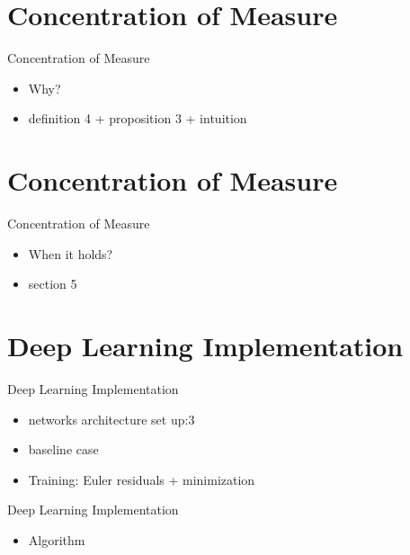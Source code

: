 \documentclass[dvipsnames,mathserif]{beamer}
\begin{document}
{\section{Concentration of Measure}
\begin{frame}{Concentration of Measure}
    \begin{itemize}
        \item Why? 
        \vspace{0.2cm}
        \item definition 4 + proposition 3 + intuition\\
        \vspace{0.2cm}
    \end{itemize}
\end{frame}

\section{Concentration of Measure}
\begin{frame}{Concentration of Measure}
    \begin{itemize}
        \item When it holds?\\
        \vspace{0.2cm}
        \item section 5
    \end{itemize}
\end{frame}


\section{Deep Learning Implementation}
\begin{frame}{Deep Learning Implementation}
    \begin{itemize}
        \item networks architecture set up:3\\
        \vspace{0.2cm}
        \item baseline case
        \vspace{0.2cm}
        \item Training: Euler residuals + minimization
    \end{itemize}
\end{frame}

\begin{frame}{Deep Learning Implementation}
    \begin{itemize}
        \item Algorithm
    \end{itemize}
\end{frame}

}
\end{document}
